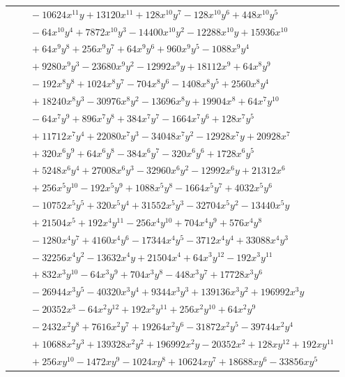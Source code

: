 \documentclass[11pt]{article}
\begin{document}
\begin{longtable}{@{}ll@{}}
 & $\quad -10624x^{11}y+13120x^{11}+128x^{10}y^{7}-128x^{10}y^{6}+448x^{10}y^{5}$\\
 & $\quad -64x^{10}y^{4}+7872x^{10}y^{3}-14400x^{10}y^{2}-12288x^{10}y+15936x^{10}$\\
 & $\quad +64x^{9}y^{8}+256x^{9}y^{7}+64x^{9}y^{6}+960x^{9}y^{5}-1088x^{9}y^{4}$\\
 & $\quad +9280x^{9}y^{3}-23680x^{9}y^{2}-12992x^{9}y+18112x^{9}+64x^{8}y^{9}$\\
 & $\quad -192x^{8}y^{8}+1024x^{8}y^{7}-704x^{8}y^{6}-1408x^{8}y^{5}+2560x^{8}y^{4}$\\
 & $\quad +18240x^{8}y^{3}-30976x^{8}y^{2}-13696x^{8}y+19904x^{8}+64x^{7}y^{10}$\\
 & $\quad -64x^{7}y^{9}+896x^{7}y^{8}+384x^{7}y^{7}-1664x^{7}y^{6}+128x^{7}y^{5}$\\
 & $\quad +11712x^{7}y^{4}+22080x^{7}y^{3}-34048x^{7}y^{2}-12928x^{7}y+20928x^{7}$\\
 & $\quad +320x^{6}y^{9}+64x^{6}y^{8}-384x^{6}y^{7}-320x^{6}y^{6}+1728x^{6}y^{5}$\\
 & $\quad +5248x^{6}y^{4}+27008x^{6}y^{3}-32960x^{6}y^{2}-12992x^{6}y+21312x^{6}$\\
 & $\quad +256x^{5}y^{10}-192x^{5}y^{9}+1088x^{5}y^{8}-1664x^{5}y^{7}+4032x^{5}y^{6}$\\
 & $\quad -10752x^{5}y^{5}+320x^{5}y^{4}+31552x^{5}y^{3}-32704x^{5}y^{2}-13440x^{5}y$\\
 & $\quad +21504x^{5}+192x^{4}y^{11}-256x^{4}y^{10}+704x^{4}y^{9}+576x^{4}y^{8}$\\
 & $\quad -1280x^{4}y^{7}+4160x^{4}y^{6}-17344x^{4}y^{5}-3712x^{4}y^{4}+33088x^{4}y^{3}$\\
 & $\quad -32256x^{4}y^{2}-13632x^{4}y+21504x^{4}+64x^{3}y^{12}-192x^{3}y^{11}$\\
 & $\quad +832x^{3}y^{10}-64x^{3}y^{9}+704x^{3}y^{8}-448x^{3}y^{7}+17728x^{3}y^{6}$\\
 & $\quad -26944x^{3}y^{5}-40320x^{3}y^{4}+9344x^{3}y^{3}+139136x^{3}y^{2}+196992x^{3}y$\\
 & $\quad -20352x^{3}-64x^{2}y^{12}+192x^{2}y^{11}+256x^{2}y^{10}+64x^{2}y^{9}$\\
 & $\quad -2432x^{2}y^{8}+7616x^{2}y^{7}+19264x^{2}y^{6}-31872x^{2}y^{5}-39744x^{2}y^{4}$\\
 & $\quad +10688x^{2}y^{3}+139328x^{2}y^{2}+196992x^{2}y-20352x^{2}+128xy^{12}+192xy^{11}$\\
 & $\quad +256xy^{10}-1472xy^{9}-1024xy^{8}+10624xy^{7}+18688xy^{6}-33856xy^{5}$\\

\end{longtable}
\end{document}

